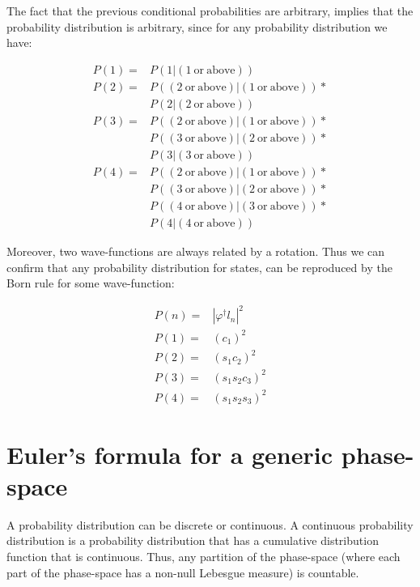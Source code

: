 \documentclass[11pt]{book}
\begin{document}
The fact that the previous conditional probabilities are arbitrary,
implies that the probability distribution is arbitrary, since for any
probability distribution we have:

\begin{equation}\begin{aligned}
    P(1)=& P(1 | (1 \mathrm{\ or\ above}))\\
    P(2)=& P( (2 \mathrm{\ or\ above}) | (1 \mathrm{\ or\ above}))*\\
    & P(2 | (2 \mathrm{\ or\ above}))\\
    P(3)=& P( (2 \mathrm{\ or\ above}) | (1 \mathrm{\ or\ above}))*\\
    & P( (3 \mathrm{\ or\ above}) | (2 \mathrm{\ or\ above}))*\\
    & P(3 | (3 \mathrm{\ or\ above}))\\
    P(4)=& P( (2 \mathrm{\ or\ above}) | (1 \mathrm{\ or\ above}))*\\
    & P( (3 \mathrm{\ or\ above}) | (2 \mathrm{\ or\ above}))*\\
    & P( (4 \mathrm{\ or\ above}) | (3 \mathrm{\ or\ above}))*\\
    & P(4 | (4 \mathrm{\ or\ above}))
\end{aligned}\end{equation}

Moreover, two wave-functions are always related by a rotation. Thus we
can confirm that any probability distribution for states, can be
reproduced by the Born rule for some wave-function:

\begin{equation}\begin{aligned}
    P(n)=&|\varphi^\dagger l_n|^2\\
    P(1)=&(c_{1})^2\\
    P(2)=&(s_{1}c_{2})^2\\
    P(3)=&(s_{1} s_{2}c_{3})^2\\
    P(4)=&(s_{1} s_{2}s_{3})^2
\end{aligned}\end{equation}

\hypertarget{eulers-formula-for-a-generic-phase-space}{%
\section{Euler's formula for a generic
phase-space}\label{eulers-formula-for-a-generic-phase-space}}

A probability distribution can be discrete or continuous. A continuous
probability distribution is a probability distribution that has a
cumulative distribution function that is continuous. Thus, any partition
of the phase-space (where each part of the phase-space has a non-null
Lebesgue measure) is countable.
\end{document}
